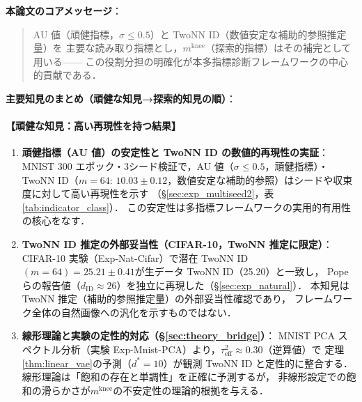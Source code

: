 \documentclass[11pt,a4paper]{jsarticle}
\newcommand{\mknee}{m^{\mathrm{knee}}}
\begin{document}
\textbf{本論文のコアメッセージ}：
\begin{quote}
AU 値（頑健指標，$\sigma \leq 0.5$）と TwoNN ID（数値安定な補助的参照推定量）を
主要な読み取り指標とし，$\mknee$（探索的指標）はその補完として用いる——
この役割分担の明確化が本多指標診断フレームワークの中心的貢献である．
\end{quote}

\textbf{主要知見のまとめ（頑健な知見→探索的知見の順）}：

\paragraph{【頑健な知見：高い再現性を持つ結果】}
\begin{enumerate}
  \item \textbf{頑健指標（AU 値）の安定性と TwoNN ID の数値的再現性の実証}：
        MNIST 300 エポック・3シード検証で，AU 値（$\sigma \leq 0.5$，頑健指標）・
        TwoNN ID（$m=64$: $10.03 \pm 0.12$，数値安定な補助的参照）はシードや収束度に対して高い再現性を示す
        （§\ref{sec:exp_multiseed2}，表\ref{tab:indicator_class}）．
        この安定性は多指標フレームワークの実用的有用性の核心をなす．
  \item \textbf{TwoNN ID 推定の外部妥当性（CIFAR-10，TwoNN 推定に限定）}：
        CIFAR-10 実験（Exp-Nat-Cifar）で潜在 TwoNN ID$(m=64)=25.21\pm0.41$が生データ TwoNN ID（25.20）と一致し，
        Pope ら\cite{pope2021intrinsic}の報告値（$d_\mathrm{ID} \approx 26$）を独立に再現した（§\ref{sec:exp_natural}）．
        本知見は TwoNN 推定（補助的参照推定量）の外部妥当性確認であり，
        フレームワーク全体の自然画像への汎化を示すものではない．
  \item \textbf{線形理論と実験の定性的対応（§\ref{sec:theory_bridge}）}：
        MNIST PCA スペクトル分析（実験 Exp-Mnist-PCA）より，$\tau^2_\mathrm{eff} \approx 0.30$（逆算値）で
        定理\ref{thm:linear_vae}の予測（$d^*=10$）が観測 TwoNN ID と定性的に整合する．
        線形理論は「飽和の存在と単調性」を正確に予測するが，
        非線形設定での飽和の滑らかさが$\mknee$の不安定性の理論的根拠を与える．
\end{enumerate}
\end{document}
